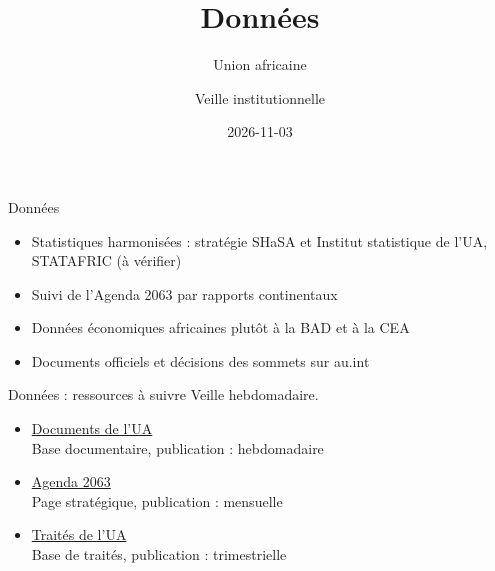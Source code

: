 \documentclass[aspectratio=169,11pt]{beamer}
\title{Données}
\subtitle{Union africaine}
\author{Veille institutionnelle}
\date{2026-11-03}
\begin{document}
\begin{frame}\titlepage\end{frame}

\begin{frame}{Données}
\begin{itemize}
\item Statistiques harmonisées : stratégie SHaSA et Institut statistique de l'UA, STATAFRIC (à vérifier)
\item Suivi de l'Agenda 2063 par rapports continentaux
\item Données économiques africaines plutôt à la BAD et à la CEA
\item Documents officiels et décisions des sommets sur au.int
\end{itemize}
\end{frame}

\begin{frame}{Données : ressources à suivre}
\small
Veille hebdomadaire.
\begin{itemize}
\item \href{https://au.int/en/documents}{Documents de l'UA}\\{\footnotesize Base documentaire, publication : hebdomadaire}
\item \href{https://au.int/en/agenda2063/overview}{Agenda 2063}\\{\footnotesize Page stratégique, publication : mensuelle}
\item \href{https://au.int/en/treaties}{Traités de l'UA}\\{\footnotesize Base de traités, publication : trimestrielle}
\end{itemize}
\end{frame}
\end{document}
